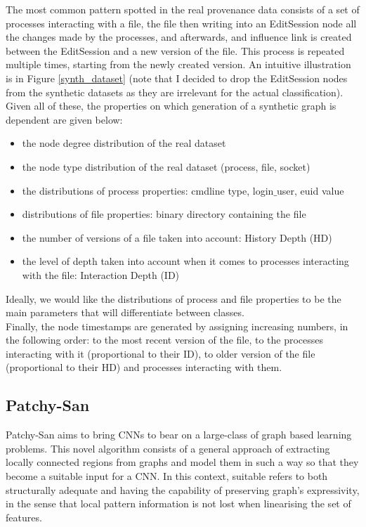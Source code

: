 The most common pattern spotted in the real provenance data consists of a set of processes interacting with a file, the file then writing into an EditSession node all the changes made by the processes, and afterwards, and influence link is created between the EditSession and a new version of the file. This process is repeated multiple times, starting from the newly created version. An intuitive illustration is in Figure \ref{synth_dataset} (note that I decided to drop the EditSession nodes from the synthetic datasets as they are irrelevant for the actual classification). Given all of these, the properties on which generation of a synthetic graph is dependent are given below:

\begin{itemize}
    \item the node degree distribution of the real dataset
    \item the node type distribution of the real dataset (process, file, socket)
    \item the distributions of process properties: cmdline type, login$\_$user, euid value
    \item distributions of file properties: binary directory containing the file
    \item the number of versions of a file taken into account: History Depth (HD)
    \item the level of depth taken into account when it comes to processes interacting with the file: Interaction Depth (ID)
\end{itemize}

Ideally, we would like the distributions of process and file properties to be the main parameters that will differentiate between classes. \\

Finally, the node timestamps are generated by assigning increasing numbers, in the following order: to the most recent version of the file, to the processes interacting with it (proportional to their ID), to older version of the file (proportional to their HD) and processes interacting with them. \\

\subsection{Patchy-San}

Patchy-San aims to bring CNNs to bear on a large-class of graph based learning problems. This novel algorithm consists of a general approach of extracting locally connected regions from graphs and model them in such a way so that they become a suitable input for a CNN. In this context, suitable refers to both structurally adequate and having the capability of preserving graph's expressivity, in the sense that local pattern information is not lost when linearising the set of features. \\


